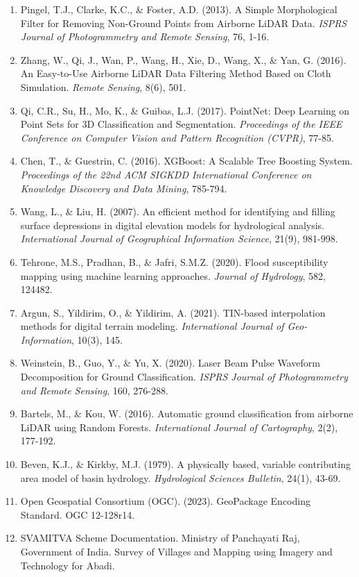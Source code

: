 \documentclass[a4paper,12pt]{article}
\begin{document}
\begin{enumerate}
	\item Pingel, T.J., Clarke, K.C., \& Foster, A.D. (2013). A Simple Morphological Filter for Removing Non-Ground Points from Airborne LiDAR Data. \textit{ISPRS Journal of Photogrammetry and Remote Sensing}, 76, 1-16.

	\item Zhang, W., Qi, J., Wan, P., Wang, H., Xie, D., Wang, X., \& Yan, G. (2016). An Easy-to-Use Airborne LiDAR Data Filtering Method Based on Cloth Simulation. \textit{Remote Sensing}, 8(6), 501.

	\item Qi, C.R., Su, H., Mo, K., \& Guibas, L.J. (2017). PointNet: Deep Learning on Point Sets for 3D Classification and Segmentation. \textit{Proceedings of the IEEE Conference on Computer Vision and Pattern Recognition (CVPR)}, 77-85.

	\item Chen, T., \& Guestrin, C. (2016). XGBoost: A Scalable Tree Boosting System. \textit{Proceedings of the 22nd ACM SIGKDD International Conference on Knowledge Discovery and Data Mining}, 785-794.

	\item Wang, L., \& Liu, H. (2007). An efficient method for identifying and filling surface depressions in digital elevation models for hydrological analysis. \textit{International Journal of Geographical Information Science}, 21(9), 981-998.

	\item Tehrone, M.S., Pradhan, B., \& Jafri, S.M.Z. (2020). Flood susceptibility mapping using machine learning approaches. \textit{Journal of Hydrology}, 582, 124482.

	\item Argun, S., Yildirim, O., \& Yildirim, A. (2021). TIN-based interpolation methods for digital terrain modeling. \textit{International Journal of Geo-Information}, 10(3), 145.

	\item Weinstein, B., Guo, Y., \& Yu, X. (2020). Laser Beam Pulse Waveform Decomposition for Ground Classification. \textit{ISPRS Journal of Photogrammetry and Remote Sensing}, 160, 276-288.

	\item Bartels, M., \& Kou, W. (2016). Automatic ground classification from airborne LiDAR using Random Forests. \textit{International Journal of Cartography}, 2(2), 177-192.

	\item Beven, K.J., \& Kirkby, M.J. (1979). A physically based, variable contributing area model of basin hydrology. \textit{Hydrological Sciences Bulletin}, 24(1), 43-69.

	\item Open Geospatial Consortium (OGC). (2023). GeoPackage Encoding Standard. OGC 12-128r14.

	\item SVAMITVA Scheme Documentation. Ministry of Panchayati Raj, Government of India. Survey of Villages and Mapping using Imagery and Technology for Abadi.
\end{enumerate}
\end{document}
